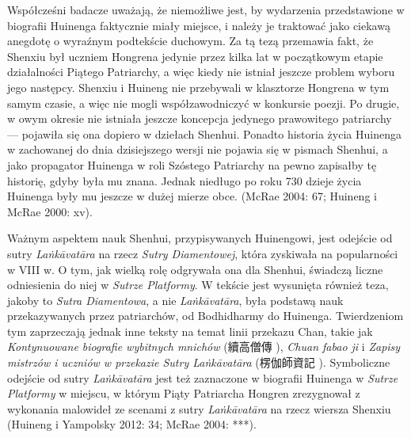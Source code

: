 Współcześni badacze uważają, że niemożliwe jest, by wydarzenia przedstawione w biografii Huinenga faktycznie miały miejsce, i należy je traktować jako ciekawą anegdotę o wyraźnym podtekście duchowym. Za tą tezą przemawia fakt, że Shenxiu był uczniem Hongrena jedynie przez kilka lat w początkowym etapie działalności Piątego Patriarchy, a więc kiedy nie istniał jeszcze problem wyboru jego następcy. Shenxiu i Huineng nie przebywali w klasztorze Hongrena w tym samym czasie, a więc nie mogli współzawodniczyć w konkursie poezji. Po drugie, w owym okresie nie istniała jeszcze koncepcja jedynego prawowitego patriarchy --- pojawiła się ona dopiero w dziełach Shenhui. Ponadto historia życia Huinenga w zachowanej do dnia dzisiejszego wersji nie pojawia się w pismach Shenhui, a jako propagator Huinenga w roli Szóstego Patriarchy na pewno zapisałby tę historię, gdyby była mu znana. Jednak niedługo po roku 730 dzieje życia Huinenga były mu jeszcze w dużej mierze obce. (McRae 2004: 67; Huineng i McRae 2000: xv).

Ważnym aspektem nauk Shenhui, przypisywanych Huinengowi, jest odejście od sutry \textit{La\.nkā\-vatāra} na rzecz \textit{Sutry Diamentowej}, która zyskiwała na popularności w VIII w. O tym, jak wielką rolę odgrywała ona dla Shenhui, świadczą liczne odniesienia do niej w \textit{Sutrze Platformy}. W tekście jest wysunięta również teza, jakoby to \textit{Sutra Diamentowa}, a nie \textit{La\.nkāvatāra}, była podstawą nauk przekazywanych przez patriarchów, od Bodhidharmy do Huinenga. Twierdzeniom tym zaprzeczają jednak inne teksty na temat linii przekazu Chan, takie jak \textit{Kontynuowane biografie wybitnych mnichów} (續高僧傳 ), \textit{Chuan fabao ji}  i \textit{Zapisy mistrzów i uczniów w przekazie Sutry La\.nkāvatāra} (楞伽師資記 ). Symboliczne odejście od sutry \textit{La\.nkāvatāra} jest też zaznaczone w biografii Huinenga w \textit{Sutrze Platformy} w miejscu, w którym Piąty Patriarcha Hongren zrezygnował z wykonania malowideł ze scenami z sutry \textit{La\.nkāvatāra} na rzecz wiersza Shenxiu (Huineng i Yampolsky 2012: 34; McRae 2004: ***).

